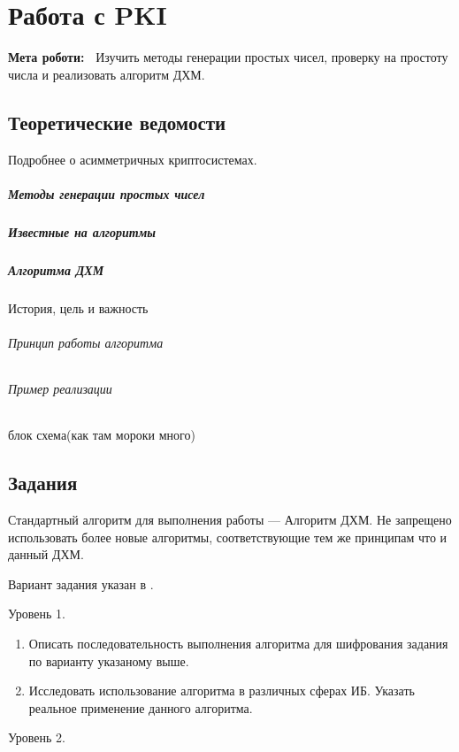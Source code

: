 \chapter{Работа с PKI} \label{chapt2}%
\textbf{Мета роботи:~}%
Изучить методы генерации простых чисел, проверку на простоту числа и
реализовать алгоритм ДХМ.
\section{Теоретические ведомости} \label{sect2_a}
Подробнее о асимметричных криптосистемах.

\paragraph{Методы генерации простых чисел}

\paragraph{Известные на алгоритмы}

\paragraph{Алгоритма ДХМ}
История, цель и важность

\subparagraph{Принцип работы алгоритма}

\subparagraph{Пример реализации}
блок схема(как там мороки много)

\section{Задания}\label{sect2_b}
%
Стандартный алгоритм для выполнения работы --- Алгоритм ДХМ. Не запрещено
использовать более новые алгоритмы, соответствующие тем же принципам что и
данный ДХМ.

Вариант задания указан в .

\noindent Уровень 1.

\begin{enumerate}
    \item Описать последовательность выполнения алгоритма для шифрования
        задания по варианту указаному выше.
  \item Исследовать использование алгоритма в различных сферах ИБ. Указать
      реальное применение данного алгоритма.
\end{enumerate}

\noindent Уровень 2.

